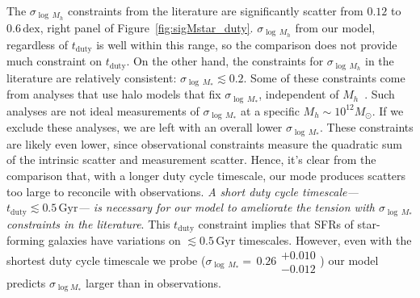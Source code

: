 \documentclass[12pt, letterpaper, preprint, tighten]{aastex62}
\begin{document}
The $\sigma_{\log\,M_h}$ constraints from the literature are significantly scatter 
from $0.12$ to $0.6\,\mathrm{dex}$, right panel of Figure~\ref{fig:sigMstar_duty}.
$\sigma_{\log\,M_h}$ from our model, regardless of $t_\mathrm{duty}$ is well 
within this range, so the comparison does not provide much constraint on 
$t_\mathrm{duty}$. On the other hand, the constraints for $\sigma_{\log\,M_h}$ 
in the literature are relatively consistent: $\sigma_{\log\,M_*} \lesssim 0.2$.
Some of these constraints come from analyses that use halo models that 
fix $\sigma_{\log\,M_*}$, independent of 
$M_h$~\citep{leauthaud2012, tinker2013, zu2015}. Such analyses are not ideal 
measurements of $\sigma_{\log\,M_*}$ at a specific $M_h\sim 10^{12}M_\odot$.
If we exclude these analyses, we are left with an overall lower 
$\sigma_{\log\,M_*}$. 
These constraints are likely even lower, since observational constraints measure
the quadratic sum of the intrinsic scatter and measurement scatter. 
Hence, it's clear from the comparison that, with a longer duty cycle timescale, 
our mode produces scatters too large to reconcile with observations.
\emph{A short duty cycle timescale--- $t_\mathrm{duty} \lesssim 0.5\,\mathrm{Gyr}$--- 
is necessary for our model to ameliorate the tension with $\sigma_{\log\,M_*}$ 
constraints in the literature}. This $t_\mathrm{duty}$ constraint implies
that SFRs of star-forming galaxies have variations on 
$\lesssim 0.5\,\mathrm{Gyr}$ timescales. However, even with the shortest 
duty cycle timescale we probe  
{\color{red}
($\sigma_{\log\,M_*}{=}\,0.26\substack{+0.010\\ -0.012}$)
}
our model predicts $\sigma_{\log M_*}$ larger than in observations. 
\end{document}
